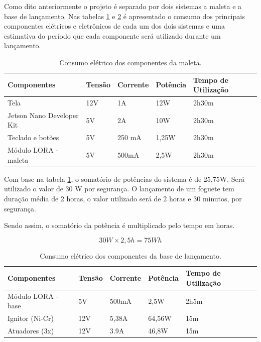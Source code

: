Como dito anteriormente o projeto é separado por dois sistemas a maleta e a base de lançamento. Nas tabelas \ref{tab:consumo1} e \ref{tab:consumo2} é apresentado o consumo dos principais componentes elétricos e eletrônicos de cada um dos dois sistemas e uma estimativa do período que cada componente será utilizado durante um lançamento. 

\begin{center}
\begin{table}[H]
\centering
\begin{tabular}{ |m{4cm}|m{2cm}|m{2cm}|m{2cm}|m{3cm}|} 
\hline
\textbf{Componentes}&\textbf{Tensão} & \textbf{Corrente}& \textbf{Potência} & \textbf{Tempo de Utilização}\\ 
 \hline
 Tela & 12V & 1A & 12W & 2h30m\\
  \hline
Jetson Nano Developer Kit & 5V & 2A & 10W & 2h30m\\
  \hline
 Teclado e botões & 5V & 250 mA & 1,25W & 2h30m\\ 
  \hline
 Módulo LORA - maleta & 5V & 500mA & 2,5W &2h30m\\ 
 \hline
 
 \hline
\end{tabular}
\caption{Consumo elétrico dos componentes da maleta.}
\label{tab:consumo1}
\end{table}
\end{center}

Com base na tabela \ref{tab:consumo1}, o somatório de potências do sistema é de 25,75W. Será utilizado o valor de 30 W por segurança. O lançamento de um foguete tem duração média de 2 horas, o valor utilizado será de 2 horas e 30 minutos, por segurança.

Sendo assim, o somatório da potência é multiplicado pelo tempo em horas.

\begin{equation}
    30W \times 2,5h = 75 Wh
\end{equation}

\begin{center}
\begin{table}[H]
\centering
\begin{tabular}{ |m{4cm}|m{2cm}|m{2cm}|m{2cm}|m{3cm}|} 
\hline
\textbf{ Componentes }&\textbf{ Tensão} & \textbf{Corrente }& \textbf{Potência} & \textbf{Tempo de Utilização}\\ 
 \hline
 Módulo LORA - base & 5V & 500mA & 2,5W & 2h5m\\ 
 \hline
 Ignitor (Ni-Cr) & 12V & 5,38A & 64,56W & 15m \\
 \hline
 Atuadores (3x) & 12V & 3.9A & 46,8W & 15m \\ 
 \hline
\end{tabular}
\caption{Consumo elétrico dos componentes da base de lançamento.}
\label{tab:consumo2}
\end{table}
\end{center}


